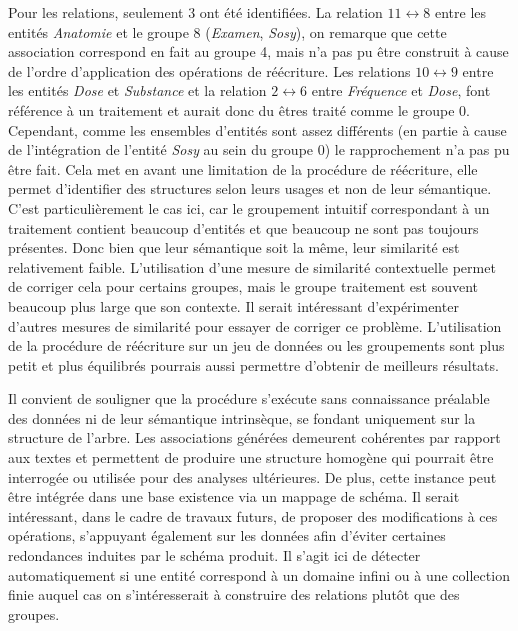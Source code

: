 Pour les relations, seulement \num{3} ont été identifiées.
La relation $11 \leftrightarrow 8$ entre les entités \emph{Anatomie} et le groupe 8 (\emph{Examen}, \emph{Sosy}), on remarque que cette association correspond en fait au groupe 4, mais n'a pas pu être construit à cause de l'ordre d'application des opérations de réécriture.
Les relations $10 \leftrightarrow 9$ entre les entités \emph{Dose} et \emph{Substance} et la relation $2 \leftrightarrow 6$ entre \emph{Fréquence} et \emph{Dose}, font référence à un traitement et aurait donc du êtres traité comme le groupe 0.
Cependant, comme les ensembles d'entités sont assez différents (en partie à cause de l'intégration de l'entité \emph{Sosy} au sein du groupe 0) le rapprochement n'a pas pu être fait.
Cela met en avant une limitation de la procédure de réécriture, elle permet d'identifier des structures selon leurs usages et non de leur sémantique.
C'est particulièrement le cas ici, car le groupement intuitif correspondant à un traitement contient beaucoup d'entités et que beaucoup ne sont pas toujours présentes.
Donc bien que leur sémantique soit la même, leur similarité est relativement faible.
L'utilisation d'une mesure de similarité contextuelle permet de corriger cela pour certains groupes, mais le groupe traitement est souvent beaucoup plus large que son contexte.
Il serait intéressant d'expérimenter d'autres mesures de similarité pour essayer de corriger ce problème.
L'utilisation de la procédure de réécriture sur un jeu de données ou les groupements sont plus petit et plus équilibrés pourrais aussi permettre d'obtenir de meilleurs résultats.

Il convient de souligner que la procédure s'exécute sans connaissance préalable des données ni de leur sémantique intrinsèque, se fondant uniquement sur la structure de l'arbre.
Les associations générées demeurent cohérentes par rapport aux textes et permettent de produire une structure homogène qui pourrait être interrogée ou utilisée pour des analyses ultérieures.
De plus, cette instance peut être intégrée dans une base existence via un mappage de schéma.
Il serait intéressant, dans le cadre de travaux futurs, de proposer des modifications à ces opérations, s'appuyant également sur les données afin d'éviter certaines redondances induites par le schéma produit.
Il s'agit ici de détecter automatiquement si une entité correspond à un domaine infini ou à une collection finie auquel cas on s'intéresserait à construire des relations plutôt que des groupes.

